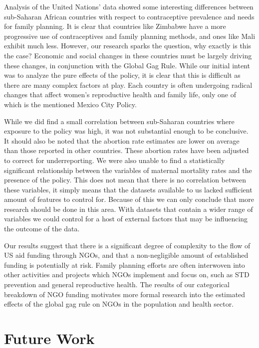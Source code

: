 \documentclass[11pt,]{article}
\begin{document}
Analysis of the United Nations' data showed some interesting differences
between sub-Saharan African countries with respect to contraceptive
prevalence and needs for family planning. It is clear that countries
like Zimbabwe have a more progressive use of contraceptives and family
planning methods, and ones like Mali exhibit much less. However, our
research sparks the question, why exactly is this the case? Economic and
social changes in these countries must be largely driving these changes,
in conjunction with the Global Gag Rule. While our initial intent was to
analyze the pure effects of the policy, it is clear that this is
difficult as there are many complex factors at play. Each country is
often undergoing radical changes that affect women's reproductive health
and family life, only one of which is the mentioned Mexico City Policy.

While we did find a small correlation between sub-Saharan countries
where exposure to the policy was high, it was not substantial enough to
be conclusive. It should also be noted that the abortion rate estimates
are lower on average than those reported in other countries. These
abortion rates have been adjusted to correct for underreporting. We were
also unable to find a statistically significant relationship between the
variables of maternal mortality rates and the presence of the policy.
This does not mean that there is no correlation between these variables,
it simply means that the datasets available to us lacked sufficient
amount of features to control for. Because of this we can only conclude
that more research should be done in this area. With datasets that
contain a wider range of variables we could control for a host of
external factors that may be influencing the outcome of the data.

Our results suggest that there is a significant degree of complexity to
the flow of US aid funding through NGOs, and that a non-negligible
amount of established funding is potentially at risk. Family planning
efforts are often interwoven into other activities and projects which
NGOs implement and focus on, such as STD prevention and general
reproductive health. The results of our categorical breakdown of NGO
funding motivates more formal research into the estimated effects of the
global gag rule on NGOs in the population and health sector.

\section{Future Work}\label{future-work}
\end{document}
